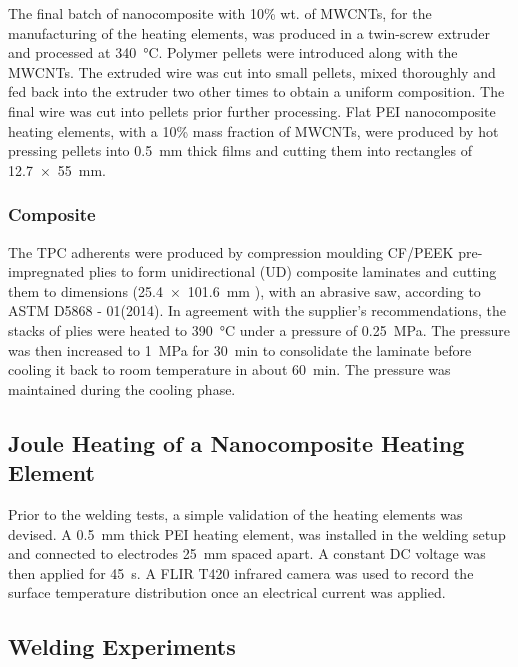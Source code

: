 \documentclass[11pt,review,times]{elsarticle}
\begin{document}
The final batch of nanocomposite with 10\% wt. of MWCNTs, for the manufacturing of the heating elements, was produced in a twin-screw extruder and processed at \SI{340}{\celsius}. 
Polymer pellets were introduced along with the MWCNTs. 
The extruded wire was cut into small pellets, mixed thoroughly and fed back into the extruder two other times to obtain a uniform composition. 
The final wire was cut into pellets prior further processing. 
Flat PEI nanocomposite heating elements, with a 10\% mass fraction of MWCNTs, were produced by hot pressing pellets into \SI{0.5}{\milli\metre} thick films and cutting them into rectangles of \SI{12.7 x 55}{\milli\metre}. 

\subsubsection{Composite}

The TPC adherents were produced by compression moulding CF/PEEK pre-impregnated plies to form unidirectional (UD) composite laminates and cutting them to dimensions (\SI{25.4 x 101.6}{\milli\metre} ), with an abrasive saw, according to ASTM D5868 - 01(2014). 
In agreement with the supplier’s recommendations, the stacks of plies were heated to \SI{390}{\celsius} under a pressure of \SI{0.25}{\MPa}. 
The pressure was then increased to \SI{1}{\MPa} for \SI{30}{\minute} to consolidate the laminate before cooling it back to room temperature in about \SI{60}{\minute}. 
The pressure was maintained during the cooling phase. 

\subsection{Joule Heating of a Nanocomposite Heating Element}

Prior to the welding tests, a simple validation of the heating elements was devised. 
A \SI{0.5}{\milli\metre} thick PEI heating element, was installed in the welding setup and connected to electrodes \SI{25}{\mm} spaced apart. 
A constant DC voltage was then applied for \SI{45}{\s}. 
A FLIR T420 infrared camera was used to record the surface temperature distribution once an electrical current was applied. 

\subsection{Welding Experiments}
\end{document}
